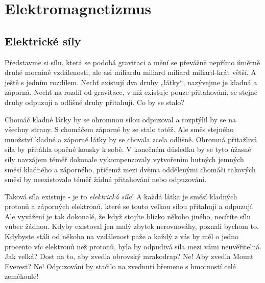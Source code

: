\graphicspath{{../src/FYZ/img/}}
\setchaptertoc
\chapter{Elektromagnetizmus}\label{fyz:IIchapI}
  \section{Elektrické síly}\label{fyz:IIchapIsecI}
    \cite[s.~13]{Feynman02} Představme si sílu, která se podobá gravitaci a mění se převážně nepřímo
    úměrně druhé mocnině vzdálenosti, ale asi miliardu miliard miliard miliard-krát větší. A ještě 
    s jedním rozdílem. Nechť existují dva druhy „látky“, nazývejme je kladná a záporná. Nechť na 
    rozdíl od gravitace, v níž existuje pouze přitahování, se stejné druhy odpuzují a odlišné druhy 
    přitahují. Co by se stalo?
    
    Chomáč kladné látky by se ohromnou silou odpuzoval a rozptýlil by se na všechny strany. S
    chomáčem záporné by se stalo totéž. Ale směs stejného množství kladné a záporné látky by se
    chovala zcela odlišně. Ohromná přitažlivá síla by přitáhla opačné kousky k sobě. V konečném
    důsledku by se tyto úžasné síly navzájem téměř dokonale vykompenzovaly vytvořením hutných
    jemných směsí kladného a záporného, přičemž mezi dvěma oddělenými chomáči takových směsí by
    neexistovalo téměř žádné přitahování nebo odpuzování.
    
    Taková síla existuje - je to \emph{elektrická síla}! A každá látka je směsí kladných protonů a 
    záporných elektronů, které se touto velkou silou přitahují a odpuzují. Ale vyvážení je tak 
    dokonalé, že když stojíte blízko někoho jiného, necítíte sílu vůbec žádnou. Kdyby existoval jen 
    malý zbytek nerovnováhy, poznali bychom to. Kdybyste stáli od někoho na vzdálenost paže a každý 
    z vás by měl o jedno procento víc elektronů než protonů, byla by odpudivá síla mezi vámi 
    neuvěřitelná. Jak velká? Dost na to, aby zvedla obrovský mrakodrap? Ne! Aby zvedla Mount 
    Everest? Ne! Odpuzování by stačilo na zvednutí břemene s hmotností celé zeměkoule!

